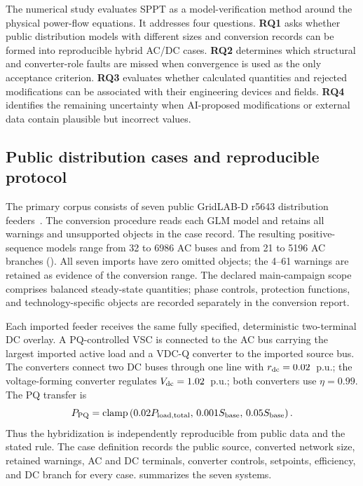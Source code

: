 The numerical study evaluates SPPT as a model-verification method around the
physical power-flow equations. It addresses four questions. \textbf{RQ1} asks whether
public distribution models with different sizes and conversion records can be
formed into reproducible hybrid AC/DC cases. \textbf{RQ2} determines which
structural and converter-role faults are missed when convergence is used as the
only acceptance criterion. \textbf{RQ3} evaluates whether calculated quantities
and rejected modifications can be associated with their engineering devices
and fields. \textbf{RQ4} identifies the remaining uncertainty when AI-proposed
modifications or external data contain plausible but incorrect values.

\subsection{Public distribution cases and reproducible protocol}

The primary corpus consists of seven public GridLAB-D r5643 distribution
feeders~\cite{gridlabd}. The conversion procedure
reads each GLM model and retains all warnings and unsupported objects in the
case record. The resulting positive-sequence models range from 32 to 6986 AC buses
and from 21 to 5196 AC branches (). All seven imports
have zero omitted objects; the 4--61 warnings are retained as evidence of the
conversion range. The declared main-campaign scope comprises balanced
steady-state quantities; phase controls, protection functions, and
technology-specific objects are recorded separately in the conversion report.

Each imported feeder receives the same fully specified, deterministic
two-terminal DC overlay. A PQ-controlled VSC is connected to the AC bus carrying
the largest imported active load and a VDC-Q converter to the imported source
bus. The converters connect two DC buses through one line with
$r_{\rm dc}=0.02$~p.u.; the voltage-forming converter regulates
$V_{\rm dc}=1.02$~p.u.; both converters use $\eta=0.99$. The PQ transfer is
\begin{equation}
 P_{\rm PQ}=\operatorname{clamp}
 \left(0.02P_{\rm load,total},\,0.001S_{\rm base},\,0.05S_{\rm base}\right).
 \label{eq:public-overlay}
\end{equation}
Thus the hybridization is independently reproducible from public data and the
stated rule. The case definition
records the public source, converted network size, retained warnings, AC and DC
terminals, converter controls, setpoints, efficiency, and DC branch for every
case.  summarizes the seven systems.

